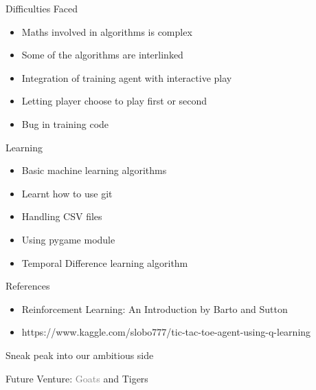 \documentclass[14pt]{beamer}
\begin{document}
\begin{frame}{Difficulties Faced}
    \begin{itemize}
        \item Maths involved in algorithms is complex
        \item Some of the algorithms are interlinked
        \item Integration of training agent with interactive play
        \item Letting player choose to play first or second
        \item Bug in training code
    \end{itemize}
\end{frame}

\begin{frame}{Learning}
    \begin{itemize}
        \item Basic machine learning algorithms
        \item Learnt how to use git
        \item Handling CSV files
        \item Using pygame module
        \item Temporal Difference learning algorithm
    \end{itemize}
\end{frame}

\begin{frame}{References}
    \begin{itemize}
        \item Reinforcement Learning: An Introduction by Barto and Sutton
        \item https://www.kaggle.com/slobo777/tic-tac-toe-agent-using-q-learning
    \end{itemize}
\end{frame}

\begin{frame}{Sneak peak into our ambitious side}
    \begin{center}
        Future Venture: \textcolor{gray}{Goats} and \textcolor{myAmber}{Tigers}
    \end{center}
\end{frame}
\end{document}
